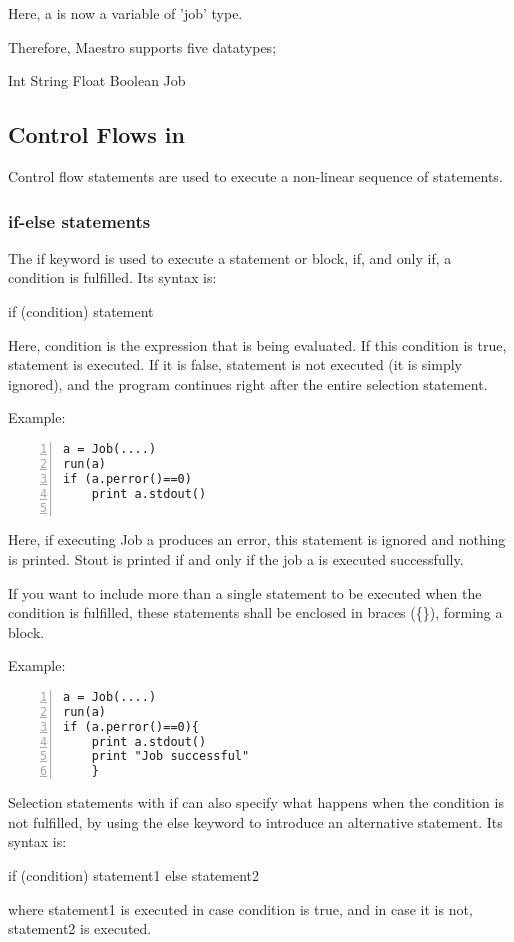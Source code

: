 Here, a is now a variable of 'job' type. 

Therefore, Maestro supports five datatypes;

Int
String
Float
Boolean
Job


\subsection*{Control Flows in \lang{}}
Control flow statements are used to execute a non-linear sequence of statements.
\subsubsection*{if-else statements}
The if keyword is used to execute a statement or block, if, and only if, a condition is fulfilled. Its syntax is:

if (condition) statement 

Here, condition is the expression that is being evaluated. If this condition is true, statement is executed. If it is false, statement is not executed (it is simply ignored), and the program continues right after the entire selection statement.

Example:
\begin{Verbatim}[numbers=left]
a = Job(....)
run(a)
if (a.perror()==0)
    print a.stdout()
    
\end{Verbatim}

Here, if executing Job a produces an error, this statement is ignored and nothing is printed. Stout is printed if and only if the job a is executed successfully.

If you want to include more than a single statement to be executed when the condition is fulfilled, these statements shall be enclosed in braces (\{\}), forming a block.

Example:

\begin{Verbatim}[numbers=left]
a = Job(....)
run(a)
if (a.perror()==0){
    print a.stdout()
    print "Job successful"
    }
\end{Verbatim}
Selection statements with if can also specify what happens when the condition is not fulfilled, by using the else keyword to introduce an alternative statement. Its syntax is:

if (condition) statement1 else statement2

where statement1 is executed in case condition is true, and in case it is not, statement2 is executed.

